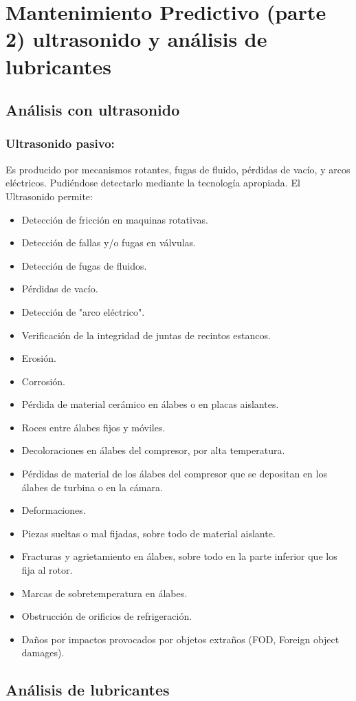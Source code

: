 \section{Mantenimiento Predictivo (parte 2) ultrasonido y análisis de lubricantes}

\subsection{Análisis con ultrasonido}
\subsubsection{Ultrasonido pasivo:}
Es producido por mecanismos rotantes, fugas de fluido, pérdidas de vacío, y arcos eléctricos. Pudiéndose detectarlo mediante la tecnología apropiada.
El Ultrasonido permite:
\begin{itemize}
\item Detección de fricción en maquinas rotativas.
\item Detección de fallas y/o fugas en válvulas.
\item Detección de fugas de fluidos.
\item Pérdidas de vacío.
\item Detección de "arco eléctrico".
\item Verificación de la integridad de juntas de recintos estancos.
\item Erosión.
\item Corrosión.
\item Pérdida de material cerámico en álabes o en placas aislantes.
\item Roces entre álabes fijos y móviles.
\item Decoloraciones en álabes del compresor, por alta temperatura.
\item Pérdidas de material de los álabes del compresor que se depositan en los álabes de turbina o en la cámara.
\item Deformaciones.
\item Piezas sueltas o mal fijadas, sobre todo de material aislante.
\item Fracturas y agrietamiento en álabes, sobre todo en la parte inferior que los fija al rotor.
\item Marcas de sobretemperatura en álabes.
\item Obstrucción de orificios de refrigeración.
\item Daños por impactos provocados por objetos extraños (FOD, Foreign object damages).

\end{itemize}
\subsection{Análisis de lubricantes}
